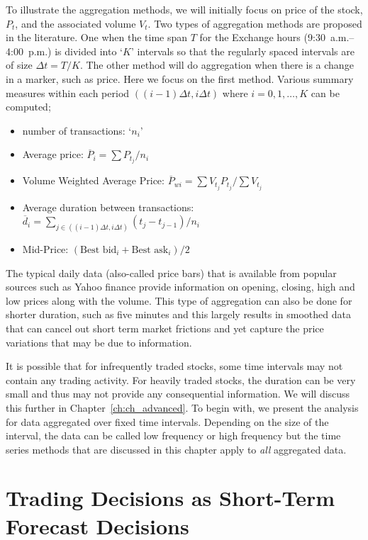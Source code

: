 To illustrate the aggregation methods, we will initially focus on price of the stock, $P_t$, and the associated volume $V_{t}$. Two types of aggregation methods are proposed in the literature. One when the time span $T$ for the Exchange hours (9:30~a.m.--4:00~p.m.) is divided into `$K$' intervals so that the regularly spaced intervals are of size $\Delta t = T/K$. The other method will do aggregation when there is a change in a marker, such as price. Here we focus on the first method. Various summary measures within each period $((i - 1)\Delta t, i\Delta t)$ where $i = 0,1,\ldots,K$ can be computed;
        \begin{itemize}
        \item number of transactions: `$n_i$'
        \item Average price: $\overline{P}_i = \sum P_{t_j}/n_i$
        \item Volume Weighted Average Price: $\overline{P}_{wi} = \sum V_{t_j} P_{t_j}/ \sum V_{t_j}$
        \item Average duration between transactions: $\overline{d}_i = \sum_{j\in ((i-1)\Delta t,i\Delta t) }(t_j - t_{j-1})/n_i$
        \item Mid-Price: $(\text{Best bid}_i+\text{Best ask}_i)/ 2$
        \end{itemize}


The typical daily data (also-called price bars) that is available from popular sources such as Yahoo finance provide information on opening, closing, high and low prices along with the volume. This type of aggregation can also be done for shorter duration, such as five minutes and this largely results in smoothed data that can cancel out short term market frictions and yet capture the price variations that may be due to information. 


It is possible that for infrequently traded stocks, some time intervals may not contain any trading activity. For heavily traded stocks, the duration can be very small and thus may not provide any consequential information. We will discuss this further in Chapter~\ref{ch:ch_advanced}. To begin with, we present the analysis for data aggregated over fixed time intervals. Depending on the size of the interval, the data can be called low frequency or high frequency but the time series methods that are discussed in this chapter apply to \emph{all} aggregated data.



\section{Trading Decisions as Short-Term Forecast Decisions \label{sec:trad_dec_stfd}} 

